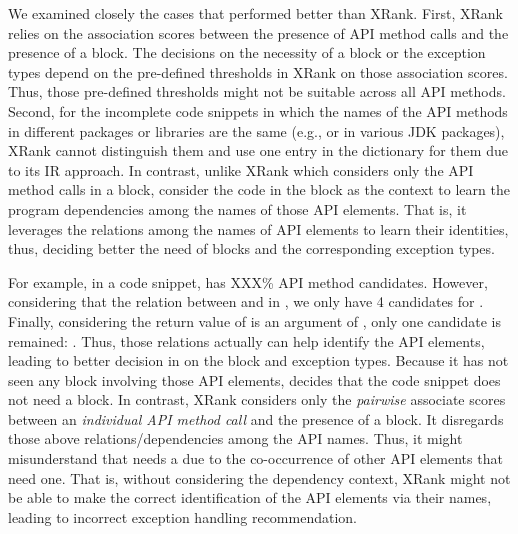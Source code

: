 We examined closely the cases that {\tool} performed better than
XRank.  First, XRank relies on the association scores between the
presence of API method calls and the presence of a 
block. The decisions on the necessity of a  block or
the exception types depend on the pre-defined thresholds in XRank on
those association scores. Thus, those pre-defined thresholds might not
be suitable across all API methods. Second, for the incomplete
code snippets in which the names of the API methods in different
packages or libraries are the same (e.g.,  or
 in various JDK packages), XRank cannot distinguish them
and use one entry in the dictionary for them due to its IR
approach. In contrast, unlike XRank which considers only the API
method calls in a  block, {\tool} consider the code in
the block as the context to learn the program dependencies among the
names of those API elements. That is, it leverages the relations among
the names of API elements to learn their identities, thus,
deciding better the need of  blocks and the
corresponding exception types.

For example, in a code snippet,  has XXX\% API method
candidates. However, considering that the relation between 
and  in , we only have
4 candidates for . Finally, considering the return value
of  is an argument of , only one
candidate is remained:
.
Thus, those relations actually can help identify the API elements,
leading to better decision in {\tool} on the  block
and exception types. Because it has not seen any 
block involving those API elements, {\tool} decides that the code
snippet does not need a  block. In contrast, XRank
considers only the {\em pairwise} associate scores between an {\em
  individual API method call} and the presence of a 
block. It disregards those above relations/dependencies among the API
names. Thus, it might misunderstand that  needs a
 due to the co-occurrence of other API elements that
need one. That is, without considering the dependency context, XRank
might not be able to make the correct identification of the API
elements via their names, leading to incorrect exception handling
recommendation.
